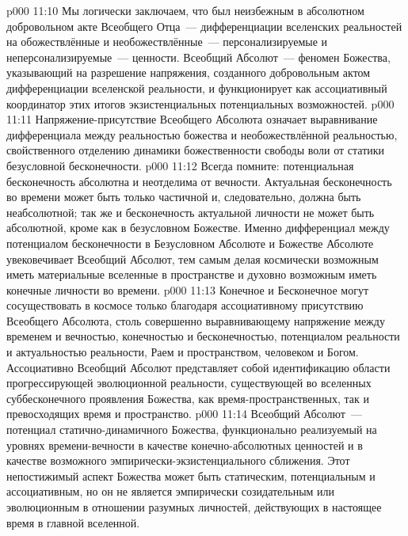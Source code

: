 \vs p000 11:10 \pc {}Мы логически заключаем, что  был неизбежным в абсолютном добровольном акте Всеобщего Отца~--- дифференциации вселенских реальностей на обожествлённые и необожествлённые~--- персонализируемые и неперсонализируемые~--- ценности. Всеобщий Абсолют~--- феномен Божества, указывающий на разрешение напряжения, созданного добровольным актом дифференциации вселенской реальности, и функционирует как ассоциативный координатор этих итогов экзистенциальных потенциальных возможностей.
\vs p000 11:11 \pc Напряжение\hyp{}присутствие Всеобщего Абсолюта означает выравнивание дифференциала между реальностью божества и необожествлённой реальностью, свойственного отделению динамики божественности свободы воли от статики безусловной бесконечности.
\vs p000 11:12 \pc Всегда помните: потенциальная бесконечность абсолютна и неотделима от вечности. Актуальная бесконечность во времени может быть только частичной и, следовательно, должна быть неабсолютной; так же и бесконечность актуальной личности не может быть абсолютной, кроме как в безусловном Божестве. Именно дифференциал между потенциалом бесконечности в Безусловном Абсолюте и Божестве Абсолюте увековечивает Всеобщий Абсолют, тем самым делая космически возможным иметь материальные вселенные в пространстве и духовно возможным иметь конечные личности во времени.
\vs p000 11:13 Конечное и Бесконечное могут сосуществовать в космосе только благодаря ассоциативному присутствию Всеобщего Абсолюта, столь совершенно выравнивающему напряжение между временем и вечностью, конечностью и бесконечностью, потенциалом реальности и актуальностью реальности, Раем и пространством, человеком и Богом. Ассоциативно Всеобщий Абсолют представляет собой идентификацию области прогрессирующей эволюционной реальности, существующей во вселенных суббесконечного проявления Божества, как время\hyp{}пространственных, так и превосходящих время и пространство.
\vs p000 11:14 Всеобщий Абсолют~--- потенциал статично\hyp{}динамичного Божества, функционально реализуемый на уровнях времени\hyp{}вечности в качестве конечно\hyp{}абсолютных ценностей и в качестве возможного эмпирически\hyp{}экзистенциального сближения. Этот непостижимый аспект Божества может быть статическим, потенциальным и ассоциативным, но он не является эмпирически созидательным или эволюционным в отношении разумных личностей, действующих в настоящее время в главной вселенной.
